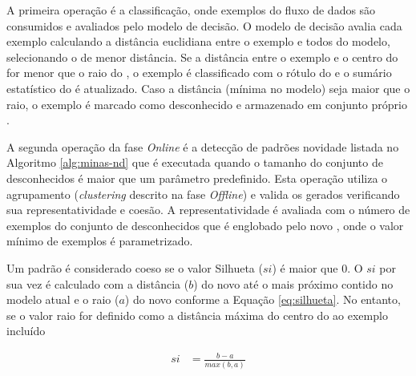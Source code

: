 A primeira operação é a classificação, onde exemplos do fluxo de dados
são consumidos e avaliados pelo modelo de decisão.
O modelo de decisão avalia cada exemplo calculando a distância euclidiana
entre o exemplo e todos \mclusters do modelo, selecionando o
\mcluster de menor distância.
Se a distância entre o exemplo e o centro do \mcluster for menor que
o raio do \mcluster, o exemplo é classificado com o rótulo do \mcluster
e o sumário estatístico do \mcluster é atualizado.
Caso a distância (mínima no modelo) seja maior que o raio,
o exemplo é marcado como desconhecido e armazenado
em conjunto próprio \cite{Faria2016minas}.

A segunda operação da fase \emph{Online} é a detecção de padrões novidade
listada no Algoritmo \ref{alg:minas-nd} que é executada quando o tamanho do
conjunto de desconhecidos é maior que um parâmetro predefinido.
Esta operação utiliza o agrupamento (\emph{clustering} descrito na fase
\emph{Offline}) e valida os \mclusters gerados verificando sua
representatividade e coesão.
A representatividade é avaliada com o número de exemplos do conjunto de
desconhecidos que é englobado pelo novo \mcluster, onde o valor mínimo de
exemplos é parametrizado.

Um padrão é considerado coeso se o valor Silhueta ($si$) é maior que $0$.
O $si$ por sua vez é calculado com a distância ($b$) do novo \mcluster até o
mais próximo contido no modelo atual e o raio ($a$) do novo \mcluster
conforme a Equação \ref{eq:silhueta}.
No entanto, se o valor raio for definido como a distância máxima do centro do
\mcluster ao exemplo incluído

\begin{align}
  \mathit{si} &= \frac{b - a}{max(b, a)} \label{eq:silhueta}
\end{align}


